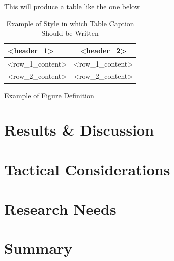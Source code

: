 \documentclass[12pt,oneside]{book}
\begin{document}
This will produce a table like the one below
\begin{table}[!ht]
	\centering
	\caption{Example of Style in which Table Caption Should be Written}
	\label{tab:<ref_name>}
	\begin{tabular}{lc}
		\toprule[1.5pt]
		<header\_1> & <header\_2> \\
		\midrule
		<row\_1\_content>     & <row\_1\_content>     \\
		<row\_2\_content>     & <row\_2\_content>     \\
		\bottomrule[1.25pt]
	\end{tabular}
\end{table}

Example of Figure Definition



\chapter{Results \& Discussion}


\chapter{Tactical Considerations}


\chapter{Research Needs}


\chapter{Summary}




\clearpage

\appendix
\captionsetup{list=no}
\end{document}
